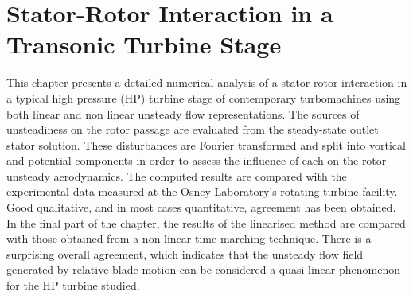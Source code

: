 %
%
%
\chapter{Stator-Rotor Interaction in a Transonic Turbine Stage}
\label{rt27.chap}
\setcounter{footnote}{0}
%
%
%
 This chapter presents a detailed  numerical analysis of a stator-rotor
 interaction in a typical high pressure (HP) turbine stage of contemporary
 turbomachines using both linear and non linear unsteady flow representations.
 The sources of unsteadiness on the rotor passage are evaluated
 from the steady-state outlet stator solution.
 These disturbances are Fourier transformed and split into
 vortical and potential components in order to assess the
 influence of each on the rotor unsteady aerodynamics.
 The computed results are compared with the experimental data
 measured at the Osney Laboratory's rotating turbine facility.
 Good qualitative, and in most cases quantitative, agreement has
 been obtained.
 In the final part of the chapter, the results of the linearised
 method are compared with those obtained from a non-linear time
 marching technique. There is a surprising overall agreement,
 which indicates that the unsteady flow field generated by
 relative blade motion
 can be considered a quasi linear phenomenon for the HP turbine
 studied.
%
%

%

%

%

%

%

%
 

